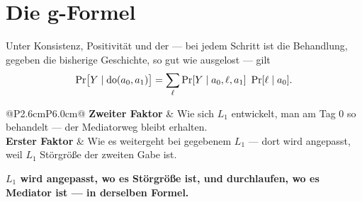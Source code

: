 \section{Die g-Formel}

\begin{merksatz}
Unter Konsistenz, Positivität und der  --- bei jedem Schritt ist die Behandlung, gegeben die bisherige Geschichte, so gut wie ausgelost --- gilt
\[ \Pr\bigl[Y \mid \operatorname{do}(a_0,a_1)\bigr] = \sum_{\ell} \Pr[Y \mid a_0, \ell, a_1]\ \Pr[\ell \mid a_0] . \]

\begin{center}
{\small
\renewcommand{\arraystretch}{1.52}
\begin{tabular}{@{}P{2.6cm}P{6.0cm}@{}}
\toprule
\textbf{Zweiter Faktor} & Wie sich $L_1$ entwickelt,  man am Tag $0$ so behandelt --- der Mediatorweg bleibt erhalten.\\
\textbf{Erster Faktor} & Wie es weitergeht bei gegebenem $L_1$ --- dort wird angepasst, weil $L_1$ Störgröße der zweiten Gabe ist.\\
\bottomrule
\end{tabular}}
\end{center}

\begin{center}
\begin{minipage}{0.9\textwidth}
\textbf{$L_1$ wird angepasst, wo es Störgröße ist, und durchlaufen, wo es Mediator ist --- in derselben Formel.}
\end{minipage}
\end{center}

\begin{center}
\begin{minipage}{0.88\textwidth}
\end{minipage}
\end{center}
\end{merksatz}

